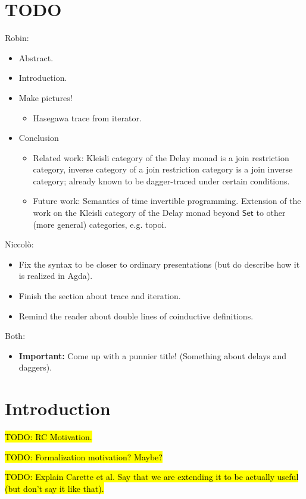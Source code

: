 \documentclass[runningheads]{llncs}
\newcommand{\Set}{\mathsf{Set}}
\newcommand{\todo}[1]{\hl{TODO: #1}}
\begin{document}
\section{TODO} %
\label{sec:todo}
Robin:
\begin{itemize}
  \item Abstract.
  \item Introduction.
  \item Make pictures! 
  \begin{itemize}
    \item Hasegawa trace from iterator.
  \end{itemize}
  \item Conclusion
  \begin{itemize}
    \item Related work: Kleisli category of the Delay monad is a join
    restriction category, inverse category of a join restriction category is a
    join inverse category; already known to be dagger-traced under certain
    conditions.
    \item Future work: Semantics of time invertible programming. Extension of
    the work on the Kleisli category of the Delay monad beyond $\Set$ to other
    (more general) categories, e.g. topoi.
  \end{itemize}
\end{itemize}
Niccolò: 
\begin{itemize}
  \item Fix the syntax to be closer to ordinary presentations (but do describe 
  how it is realized in Agda).
  \item Finish the section about trace and iteration.
  \item Remind the reader about double lines of coinductive definitions. 
\end{itemize}
Both:
\begin{itemize}
  \item \textbf{Important:} Come up with a punnier title! (Something about 
  delays and daggers).
\end{itemize}

\section{Introduction}\label{sec:intro}
\todo{RC Motivation.}

\todo{Formalization motivation? Maybe?}

\todo{Explain Carette et al. Say that we are extending it to be actually useful (but don't say it like that).}
\end{document}
